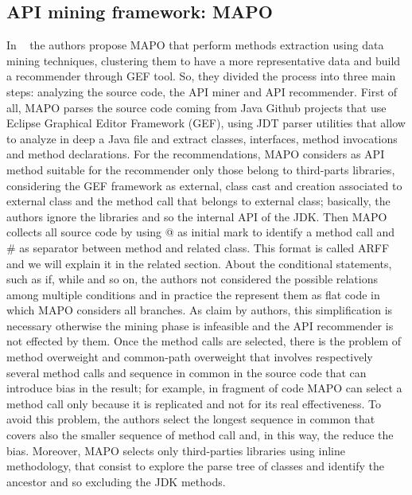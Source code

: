 \subsection{API mining framework: MAPO}
In ~\cite{zhong_mapo:_2009} the authors propose MAPO that perform methods extraction using data mining techniques, clustering them to have a more representative data and build a recommender through GEF tool. So, they divided the process into three main steps: analyzing the source code, the API miner and API recommender. First of all, MAPO parses the source code coming from Java Github projects that use Eclipse Graphical Editor Framework (GEF), using JDT parser utilities that allow to analyze in deep a Java file and extract classes, interfaces, method invocations and method declarations. For the recommendations, MAPO considers as API method suitable for the recommender only those belong to third-parts libraries, considering the GEF framework as external, class cast and creation associated to external class and the method call that belongs to external class; basically, the authors ignore the libraries and so the internal API of the JDK. Then MAPO collects all source code by using @ as initial mark to identify a method call and \# as separator between method and related class. This format is called ARFF and we will explain it in the related section. About the conditional statements, such as if, while and so on, the authors not considered the possible relations among multiple conditions and in practice the represent them as flat code in which MAPO considers all branches. As claim by authors, this simplification is necessary otherwise the mining phase is infeasible and the API recommender is not effected by them. Once the method calls are selected, there is the problem of method overweight and common-path overweight that involves respectively several method calls and sequence in common in the source code that can introduce bias in the result; for example, in fragment of code MAPO can select a method call only because it is replicated and not for its real effectiveness. To avoid this problem, the authors select the longest sequence in common that covers also the smaller sequence of method call and, in this way, the reduce the bias. Moreover, MAPO selects only third-parties libraries using inline methodology, that consist to explore the parse tree of classes and identify the ancestor and so excluding the JDK methods. \newline
